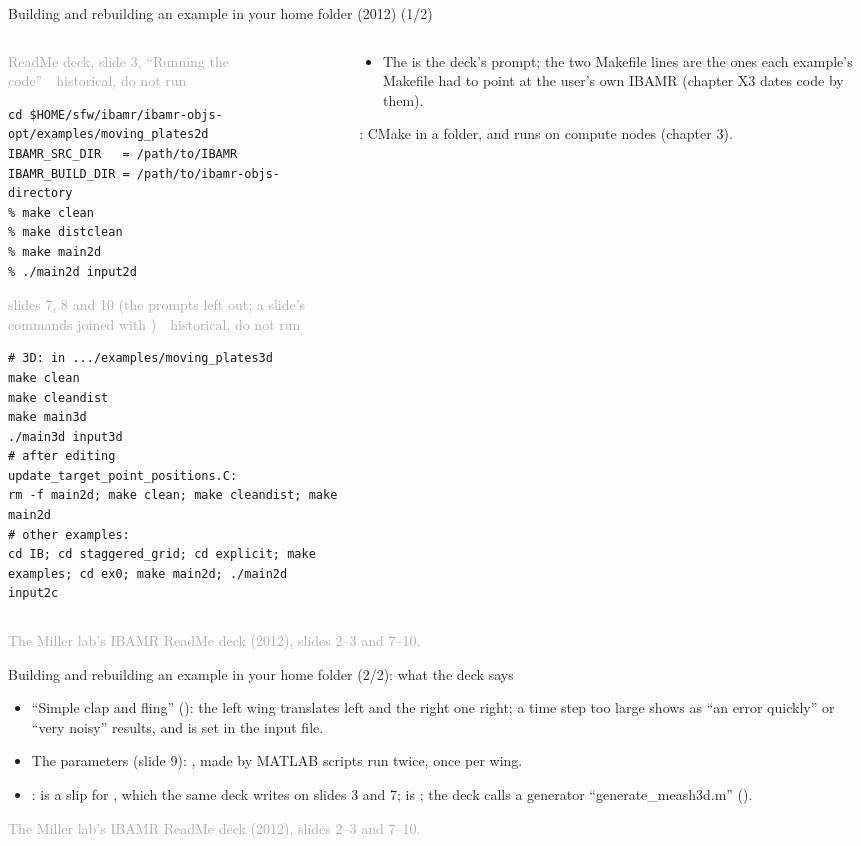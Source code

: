 \documentclass[aspectratio=169,11pt]{beamer}
\newcommand{\sourcecredit}[1]{\vfill\begin{flushright}\tiny\textcolor{DarkGray}{#1}\end{flushright}}
\newcommand{\hist}[1]{{\tiny\sffamily\textcolor{DarkGray}{#1\ \textbullet\ historical, do not run}}\par\nointerlineskip\vspace{0.3mm}}
\begin{document}
\begin{frame}[fragile]{Building and rebuilding an example in your home folder (2012) (1/2)}
\label{fr:build2012}
\begin{columns}[T,onlytextwidth]
\begin{column}{0.48\textwidth}
\hist{ReadMe deck, slide 3, ``Running the code''}
\begin{lstlisting}[style=hist]
cd $HOME/sfw/ibamr/ibamr-objs-opt/examples/moving_plates2d
IBAMR_SRC_DIR   = /path/to/IBAMR
IBAMR_BUILD_DIR = /path/to/ibamr-objs-directory
% make clean
% make distclean
% make main2d
% ./main2d input2d
\end{lstlisting}
\hist{slides 7, 8 and 10 (the \code{\%} prompts left out; a slide's commands joined with \code{;})}
\begin{lstlisting}[style=hist]
# 3D: in .../examples/moving_plates3d
make clean
make cleandist
make main3d
./main3d input3d
# after editing update_target_point_positions.C:
rm -f main2d; make clean; make cleandist; make main2d
# other examples:
cd IB; cd staggered_grid; cd explicit; make examples; cd ex0; make main2d; ./main2d input2c
\end{lstlisting}
\end{column}
\begin{column}{0.49\textwidth}
\footnotesize
\begin{itemize}\setlength{\itemsep}{2pt}
  \item The \code{\%} is the deck's prompt; the two Makefile lines are the ones each example's Makefile had to point at the user's own IBAMR (chapter X3 dates code by them).
\end{itemize}
\vspace{1mm}
: CMake in a  folder, and runs on compute nodes (chapter 3).
\end{column}
\end{columns}
\sourcecredit{The Miller lab's IBAMR ReadMe deck (2012), slides 2--3 and 7--10.}
\end{frame}

\begin{frame}{Building and rebuilding an example in your home folder (2/2): what the deck says}
\label{fr:build2012b}
\small
\begin{itemize}\setlength{\itemsep}{4pt}
  \item ``Simple clap and fling'' (): the left wing translates left and the right one right; a time step too large shows as ``an error quickly'' or ``very noisy'' results, and  is set in the input file.
  \item The parameters (slide 9): , made by MATLAB scripts run twice, once per wing.
  \item {}:  is a slip for , which the same deck writes on slides 3 and 7;  is ; the deck calls a generator ``generate\_meash3d.m'' ().
\end{itemize}
\sourcecredit{The Miller lab's IBAMR ReadMe deck (2012), slides 2--3 and 7--10.}
\end{frame}
\end{document}
